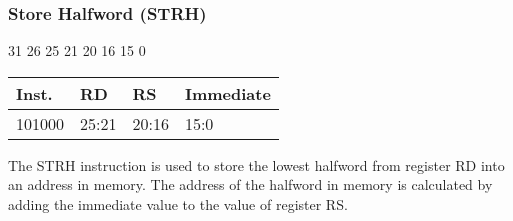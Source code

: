 \documentclass[12pt]{article}
\begin{document}

    \newpage
    \subsubsection{Store Halfword (STRH)}
    
    \hspace{1.6cm}31 \hspace{1.15cm}26 \hspace{.05cm}25 \hspace{.8cm}21 \hspace{.05cm}20 \hspace{.8cm}16 \hspace{.05cm}15 \hspace{6.4cm}0
    \vspace{-.25cm}
    \begin{center}
        \begin{tabular}{ |p{1.8cm}|p{1.5cm}|p{1.5cm}|p{6.8cm}| }
            \hline
            \textbf{Inst.} & \textbf{RD} &  \textbf{RS} & \textbf{Immediate}\\
            \hline
            101000& 25:21 & 20:16 &15:0\\
            \hline
        \end{tabular}
    \end{center}
    
    \noindent
    The STRH instruction is used to store the lowest halfword from register RD into an address in memory. The address of the halfword in memory is calculated by adding the immediate value to the value of register RS. 
    
\end{document}
